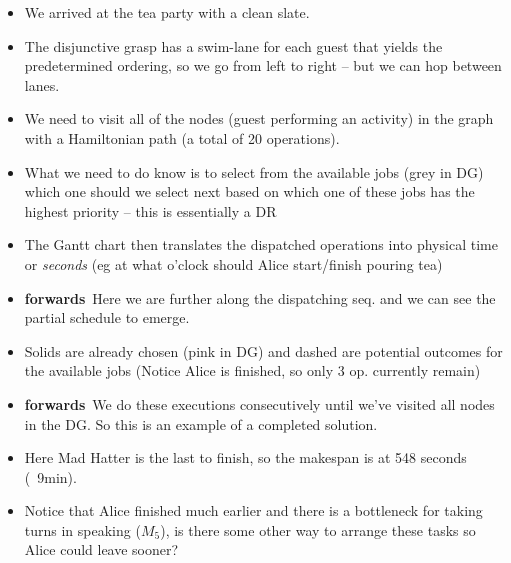\documentclass[20pt,a4paper]{extarticle}
\newcommand{\bi}{\begin{itemize}\item }
\newcommand{\ei}{\end{itemize}}
\newcommand{\forward}{{\color{red}\textbf{forwards}}~}
\newcommand{\printpage}[1]{%
    \clearpage
    \begin{figure}[t!]\centering
    \fbox{\texttt{[image: handout.pdf]}}
    \end{figure}
}
\begin{document}
\printpage{5}
\bi We arrived at the tea party with a clean slate.
    \item The disjunctive grasp has a swim-lane for each guest that yields the 
    predetermined ordering, so we go from left to right -- but we can hop 
    between lanes.
    \item We need to visit all of the nodes (guest performing an activity) in 
    the graph with a Hamiltonian path (a total of 20 operations). 
    \item What we need to do know is to select from the available jobs 
    (grey in DG) which one should we select next based on which one of 
    these jobs has the highest priority -- this is essentially a DR
    \item The Gantt chart then translates the dispatched operations into 
    physical time or \textit{seconds} (eg at what o'clock should Alice 
    start/finish pouring tea)
    \item \forward Here we are further along the dispatching seq. and we can 
    see 
    the partial schedule to emerge. 
    \item Solids are already chosen (pink in DG) and dashed are potential 
    outcomes for the available jobs (Notice Alice is finished, so only 3 
    op. currently remain)
    \item \forward We do these executions consecutively until we've visited all 
    nodes in the DG. So this is an example of a completed solution.
    \item Here Mad Hatter is the last to finish, so the makespan is at 548 
    seconds (~9min). 
    \item Notice that Alice finished much earlier and there is a bottleneck for 
    taking turns in speaking ($M_5$), is there some other way to arrange 
    these tasks so Alice could leave sooner?
\ei 
\end{document}
